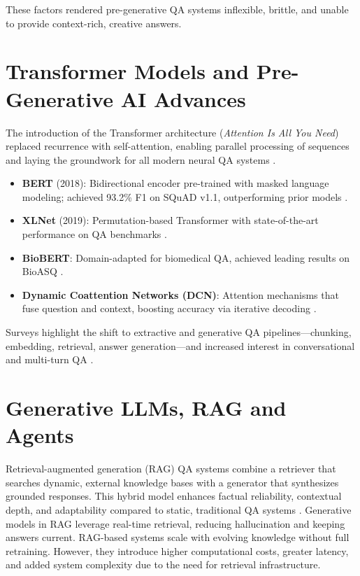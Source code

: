 \begin{spacing}{1.5}
These factors rendered pre-generative QA systems inflexible, brittle, and unable to provide context-rich, creative answers.

\section{Transformer Models and Pre-Generative AI Advances}
The introduction of the Transformer architecture (\textit{Attention Is All You Need}) replaced recurrence with self-attention, enabling parallel processing of sequences and laying the groundwork for all modern neural QA systems \citep{vaswani_attention_2017}.

\begin{itemize}
    \item \textbf{BERT} (2018): Bidirectional encoder pre-trained with masked language modeling; achieved 93.2\% F1 on SQuAD v1.1, outperforming prior models \citep{devlin_bert_2019}.
    \item \textbf{XLNet} (2019): Permutation-based Transformer with state-of-the-art performance on QA benchmarks \parencite{yang_xlnet_2020}.
    \item \textbf{BioBERT}: Domain-adapted for biomedical QA, achieved leading results on BioASQ \citep{yoon_pre-trained_2019}.
    \item \textbf{Dynamic Coattention Networks (DCN)}: Attention mechanisms that fuse question and context, boosting accuracy via iterative decoding \citep{xiong_dynamic_2018}.
\end{itemize}
Surveys highlight the shift to extractive and generative QA pipelines—chunking, embedding, retrieval, answer generation—and increased interest in conversational and multi-turn QA \citep{yue_survey_2025, antoniou_survey_2022}.

\section{Generative LLMs, RAG and Agents}

Retrieval-augmented generation (RAG) QA systems combine a retriever that searches dynamic, external knowledge bases with a generator that synthesizes grounded responses. This hybrid model enhances factual reliability, contextual depth, and adaptability compared to static, traditional QA systems \citep{yue_survey_2025,lewis_retrieval-augmented_2020}. Generative models in RAG leverage real-time retrieval, reducing hallucination and keeping answers current. RAG-based systems scale with evolving knowledge without full retraining. However, they introduce higher computational costs, greater latency, and added system complexity due to the need for retrieval infrastructure.


\end{spacing}
